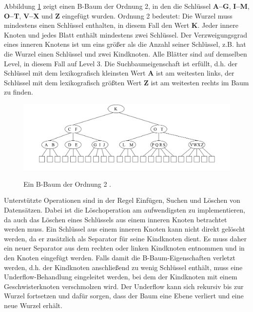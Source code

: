 Abbildung \ref{fig:pic3} zeigt einen B-Baum der Ordnung 2, in den die Schlüssel \textbf{A--G}, \textbf{I--M}, \textbf{O--T}, \textbf{V--X} und \textbf{Z} eingefügt wurden. Ordnung 2 bedeutet: Die Wurzel muss mindestens einen Schlüssel enthalten, in diesem Fall den Wert \textbf{K}. Jeder innere Knoten und jedes Blatt enthält mindestens zwei Schlüssel. Der Verzweigungsgrad eines inneren Knotens ist um eins größer als die Anzahl seiner Schlüssel, z.B. hat die Wurzel einen Schlüssel und zwei Kindknoten. Alle Blätter sind auf demselben Level, in diesem Fall auf Level 3. Die Suchbaumeigenschaft ist erfüllt, d.h. der Schlüssel mit dem lexikografisch kleinsten Wert \textbf{A} ist am weitesten links, der Schlüssel mit dem lexikografisch größten Wert \textbf{Z} ist am weitesten rechts im Baum zu finden. 
\begin{figure}[hpbt]
  \centering
  \includegraphics[width=1.0\textwidth]{pictures/b-baum.png}\\
  \caption[Ein B-Baum der Ordnung 2]{Ein B-Baum der Ordnung 2 \cite{Kriegel1994--2013}.}\label{fig:pic3}
\end{figure}
Unterstützte Operationen sind in der Regel Einfügen, Suchen und Löschen von Datensätzen. Dabei ist die Löschoperation am aufwendigsten zu implementieren, da auch das Löschen eines Schlüssels aus einem inneren Knoten betrachtet werden muss. Ein Schlüssel aus einem inneren Knoten kann nicht direkt gelöscht werden, da er zusätzlich als Separator für seine Kindknoten dient. Es muss daher ein neuer Separator aus dem rechten oder linken Kindknoten entnommen und in den Knoten eingefügt werden. Falls damit die B-Baum-Eigenschaften verletzt werden, d.h. der Kindknoten anschließend zu wenig Schlüssel enthält, muss eine Underflow-Behandlung eingeleitet werden, bei dem der Kindknoten mit einem Geschwisterknoten verschmolzen wird. Der Underflow kann sich rekursiv bis zur Wurzel fortsetzen und dafür sorgen, dass der Baum eine Ebene verliert und eine neue Wurzel erhält. 
